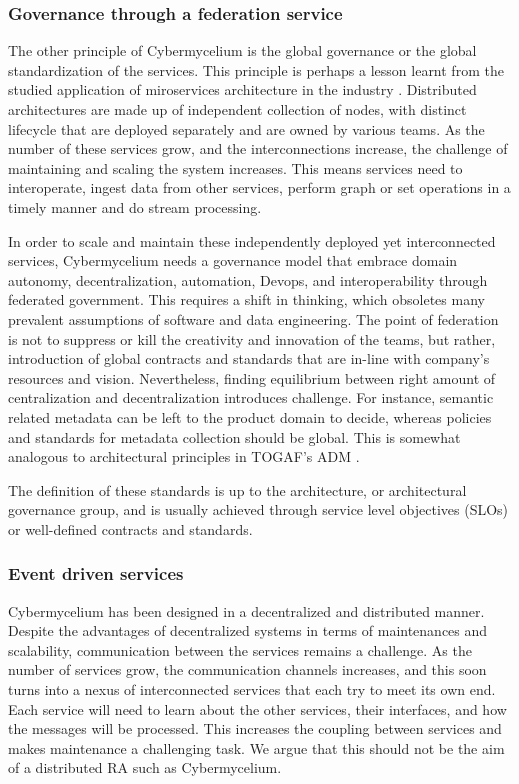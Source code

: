 \documentclass{bmcart}
\begin{document}
\subsubsection{Governance through a federation service}

The other principle of Cybermycelium is the global governance or the global standardization of the services. This principle is perhaps a lesson learnt from the studied application of miroservices architecture in the industry \cite{alshuqayran2016systematic}. Distributed architectures are made up of independent collection of nodes, with distinct lifecycle that are deployed separately and are owned by various teams. As the number of these services grow, and the interconnections increase, the challenge of maintaining and scaling the system increases. This means services need to interoperate, ingest data from other services, perform graph or set operations in a timely manner and do stream processing.

In order to scale and maintain these independently deployed yet interconnected services, Cybermycelium needs a governance model that embrace domain autonomy, decentralization, automation, Devops, and interoperability through federated government. This requires a shift in thinking, which obsoletes many prevalent assumptions of software and data engineering. The point of federation is not to suppress or kill the creativity and innovation of the teams, but rather, introduction of global contracts and standards that are in-line with company's resources and vision. Nevertheless, finding equilibrium between right amount of centralization and decentralization introduces challenge. For instance, semantic related metadata can be left to the product domain to decide, whereas policies and standards for metadata collection should be global. This is somewhat analogous to architectural principles in TOGAF's ADM \cite{josey2016togaf}.

The definition of these standards is up to the architecture, or architectural governance group, and is usually achieved through service level objectives (SLOs) or well-defined contracts and standards.

\subsubsection{Event driven services}

Cybermycelium has been designed in a decentralized and distributed manner. Despite the advantages of decentralized systems in terms of maintenances and scalability, communication between the services remains a challenge. As the number of services grow, the communication channels increases, and this soon turns into a nexus of interconnected services that each try to meet its own end. Each service will need to learn about the other services, their interfaces, and how the messages will be processed. This increases the coupling between services and makes maintenance a challenging task. We argue that this should not be the aim of a distributed RA such as Cybermycelium.
\end{document}
